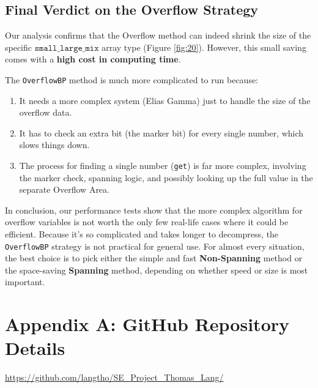 \documentclass[11pt, a4paper]{article}
\begin{document}
	\subsection{Final Verdict on the Overflow Strategy}
	
	Our analysis confirms that the Overflow method can indeed shrink the size of the specific $\texttt{small\_large\_mix}$ array type (Figure \ref{fig:20}). However, this small saving comes with a \textbf{high cost in computing time}.
	
	The \texttt{OverflowBP} method is much more complicated to run because:
	\begin{enumerate}
	\item It needs a more complex system (Elias Gamma) just to handle the size of the overflow data.
	\item It has to check an extra bit (the marker bit) for every single number, which slows things down.
	\item The process for finding a single number (\texttt{get}) is far more complex, involving the marker check, spanning logic, and possibly looking up the full value in the separate Overflow Area.
	\end{enumerate}
	
	
	In conclusion, our performance tests show that the more complex algorithm for overflow variables is not worth the only few real-life cases where it could be efficient. Because it's so complicated and takes longer to decompress, the \texttt{OverflowBP} strategy is not practical for general use. For almost every situation, the best choice is to pick either the simple and fast \textbf{Non-Spanning} method or the space-saving \textbf{Spanning} method, depending on whether speed or size is most important.




	
	\section*{Appendix A: GitHub Repository Details}
	\url{https://github.com/langtho/SE_Project_Thomas_Lang/} %
	
\end{document}
